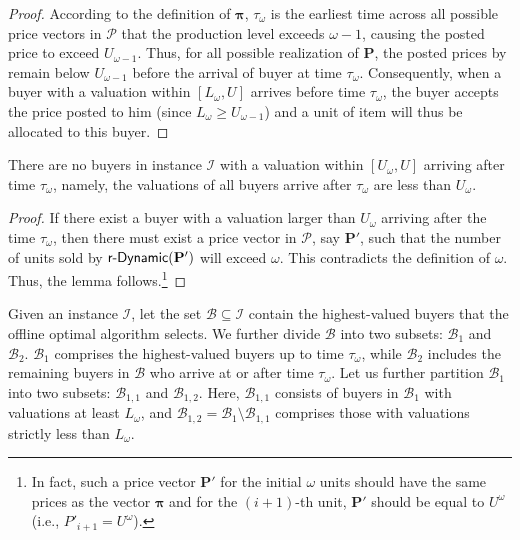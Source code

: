 \begin{proof}
    According to the definition of $\boldsymbol{\pi}$, $\tau_{\omega}$ is the earliest time across all possible price vectors in $\mathcal{P}$ that the production level exceeds $\omega-1$, causing the posted price to exceed $U_{\omega-1}$. Thus,
    for all possible realization of $\mathbf{P}$, the posted prices by \rDynamic remain below $U_{\omega-1}$ before the arrival of buyer at time $\tau_{\omega}$.  Consequently, when a buyer with a valuation within $[L_{\omega}, U]$ arrives before time $\tau_{\omega}$, the buyer accepts the price posted to him (since $ L_{\omega} \ge U_{\omega-1} $) and a unit of item will thus be allocated to this buyer.
\end{proof}
\begin{lemma}
\label{appendix:prop:main:claim2-kselection-production-cost}
    There are no buyers in instance $\mathcal{I}$ with a valuation within $[U_{\omega}, U]$ arriving after time $\tau_{\omega}$, namely, the valuations of all buyers arrive after $\tau_{\omega}$ are less than $ U_{\omega}$.
\end{lemma}

\begin{proof}
If there exist a buyer with a valuation larger than $U_{\omega}$ arriving after the time $\tau_{\omega}$, then there must exist a price vector in $\mathcal{P}$, say $ \mathbf{P}' $, such that the number of units sold by $\textsf{r-Dynamic}(\mathbf{P}')$ will exceed $\omega$. This contradicts the definition of $\omega$. Thus, the lemma follows.\footnote{In fact, such a price vector $ \mathbf{P}' $ for the initial $\omega$ units should have the same prices as the vector $\boldsymbol{\pi}$ and for the $(i+1)$-th unit, $ \mathbf{P}' $ should be equal to $ U^{\omega}$ (i.e., $ P'_{i+1} = U^{\omega}$).} 
\end{proof}

Given an instance $\mathcal{I}$, let the set $\mathcal{B} \subseteq \mathcal{I}$ contain the highest-valued buyers that the offline optimal algorithm selects. We further divide $\mathcal{B}$ into two subsets: $\mathcal{B}_{1}$ and $\mathcal{B}_{2}$. $\mathcal{B}_{1}$ comprises the highest-valued buyers up to time $\tau_{\omega}$, while $\mathcal{B}_{2}$ includes the remaining buyers in $\mathcal{B}$ who arrive at or after time $\tau_{\omega}$.
Let us further partition $\mathcal{B}_{1}$ into two subsets: $\mathcal{B}_{1,1}$ and $\mathcal{B}_{1,2}$. Here, $\mathcal{B}_{1,1}$ consists of buyers in $\mathcal{B}_{1}$ with valuations at least $L_{\omega}$, and $\mathcal{B}_{1,2} = \mathcal{B}_{1} \setminus \mathcal{B}_{1,1}$ comprises those with valuations strictly less than $L_{\omega}$.

